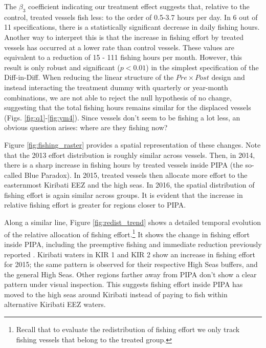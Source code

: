 \documentclass[9pttwoside,lineno]{pnas-new}
\begin{document}
The \(\beta_3\) coefficient indicating our treatment effect suggests
that, relative to the control, treated vessels fish less: to the order
of 0.5-3.7 hours per day. In 6 out of 11 specifications, there is a statistically significant decrease in daily fishing hours. Another way to interpret this is that the increase
in fishing effort by treated vessels has occurred at a lower rate than
control vessels. These values are equivalent to a reduction of 15 - 111 fishing hours per month. However, this result is only robust and
significant (\(p < 0.01\)) in the simplest specification of the
Diff-in-Diff. When reducing the linear structure of the
\(Pre \times Post\) design and instead interacting the treatment dummy
with quarterly or year-month combinations, we are not able to reject the
null hypothesis of no change, suggesting that the total fishing hours
remains similar for the displaced vessels (Figs.
\ref{fig:q1}-\ref{fig:ym4}). Since vessels don't seem to be fishing a lot less, an obvious question arises: where are they
fishing now?

Figure \ref{fig:fishing_raster} provides a spatial representation of
these changes. Note that the 2013 effort distribution is roughly similar
across vessels. Then, in 2014, there is a sharp increase in fishing hours
by treated vessels inside PIPA (the so-called Blue Paradox). In 2015, treated vessels
then allocate more effort to the easternmost Kiribati EEZ and the high seas. In 2016, the spatial distribution of
fishing effort is again similar across groups. It is evident that the
increase in relative fishing effort is greater for regions closer to
PIPA.

Along a similar line, Figure \ref{fig:redist_trend} shows a detailed
temporal evolution of the relative allocation of fishing
effort.\footnote{Recall that to evaluate the redistribution of fishing effort we only track fishing vessels that belong to the treated group.}
It shows the change in fishing effort inside PIPA, including the
preemptive fishing and immediate reduction previously reported
\citep{mcdermott_2018}. Kiribati waters in KIR 1 and KIR 2 show an
increase in fishing effort for 2015; the same pattern is observed for
their respective High Seas buffers, and the general High Seas. Other
regions farther away from PIPA don't show a clear pattern under visual
inspection. This suggests fishing effort inside PIPA has moved to the high seas around Kiribati instead of paying to fish within alternative Kiribati EEZ waters.
\end{document}
